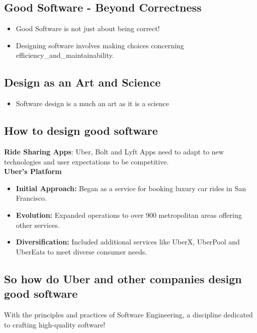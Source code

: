 \subsection{Good Software - Beyond Correctness}
\begin{itemize}
    \item Good Software is not just about being correct!
    \item Designing software involves making choices concerning \gls{efficiency_and_maintainability}.
\end{itemize}

\subsection{Design as an Art and Science}
\begin{itemize}
    \item Software design is a much an art as it is a science
\end{itemize}

\subsection{How to design good software}

\begin{example} 
    \textbf{Ride Sharing Apps}: Uber, Bolt and Lyft Apps need to adapt to new technologies and user expectations to be competitive. \\
    \textbf{Uber's Platform} \\
    \begin{itemize}
        \item \textbf{Initial Approach:} Began as a service for booking luxury car rides in San Francisco.
        \item \textbf{Evolution:} Expanded operations to over 900 metropolitan areas offering other services.
        \item \textbf{Diversification:} Included additional services like UberX, UberPool and UberEats to meet diverse consumer needs.
    \end{itemize}    
\end{example}


\subsection{So how do Uber and other companies design good software}
With the principles and practices of Software Engineering, a discipline dedicated to crafting high-quality software!


